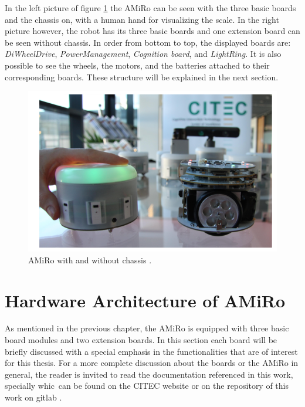\documentclass[12pt]{report}%
\begin{document}
In the left picture of figure \ref{fig:real_1} the AMiRo can be seen with the three basic boards and the chassis on, with a human hand for visualizing the scale. In the right picture however, the robot has its three basic boards and one extension board can be seen without chassis. In order from bottom to top, the displayed boards are: \textit{DiWheelDrive}, \textit{PowerManagement}, \textit{Cognition board}, and \textit{LightRing}. It is also possible to see the wheels, the motors, and the batteries attached to their corresponding boards. These structure will be explained in the next section.

\begin{figure}[h]
	\centering
	\includegraphics[width=\textwidth]{real_amiro_1}
    \caption{AMiRo with and without chassis \cite{AMiRo_paper_modular}.}
    \label{fig:real_1}
\end{figure}
\clearpage

\section{Hardware Architecture of AMiRo}
As mentioned in the previous chapter, the AMiRo is equipped with three basic board modules and two extension boards. In this section each board will be briefly discussed with a special emphasis in the functionalities that are of interest for this thesis. For a more complete discussion about the boards or the AMiRo in general, the reader is invited to read the documentation referenced in this work, specially \cite{AMiRo_paper_verstaile, AMiRo_paper_modular, AMiRo_paper_applications, AMiRo_ppt_v1, AMiRo_ppt_v2} whic\ can be found on the CITEC website or on the repository of this work on gitlab \cite{AMiRo_Git}.
\end{document}

